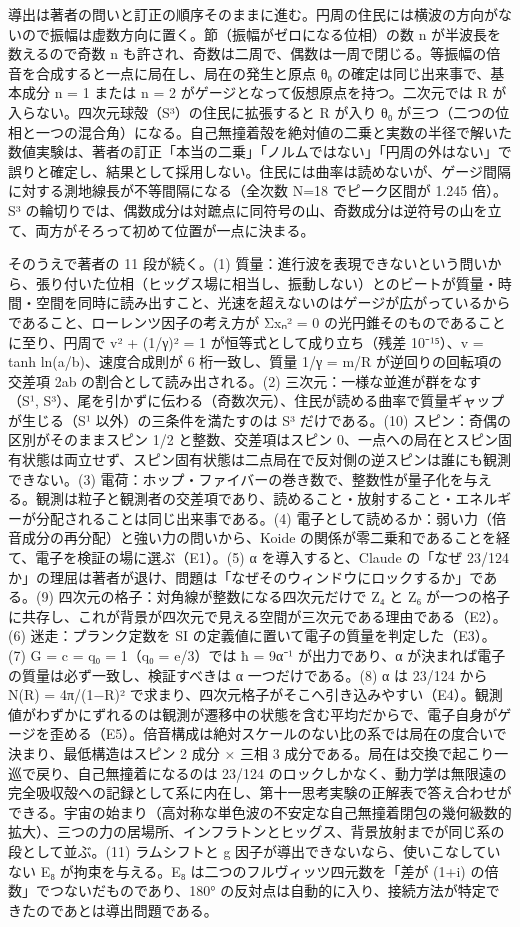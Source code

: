 \documentclass[
  a4paper,
]{ltjsarticle}
\begin{document}
導出は著者の問いと訂正の順序そのままに進む。円周の住民には横波の方向がないので振幅は虚数方向に置く。節（振幅がゼロになる位相）の数
n が半波長を数えるので奇数 n
も許され、奇数は二周で、偶数は一周で閉じる。等振幅の倍音を合成すると一点に局在し、局在の発生と原点
θ₀ の確定は同じ出来事で、基本成分 n = 1 または n = 2
がゲージとなって仮想原点を持つ。二次元では R
が入らない。四次元球殻（S³）の住民に拡張すると R が入り θ₀
が三つ（二つの位相と一つの混合角）になる。自己無撞着殻を絶対値の二乗と実数の半径で解いた数値実験は、著者の訂正「本当の二乗」「ノルムではない」「円周の外はない」で誤りと確定し、結果として採用しない。住民には曲率は読めないが、ゲージ間隔に対する測地線長が不等間隔になる（全次数
N=18 でピーク区間が 1.245 倍）。S³
の輪切りでは、偶数成分は対蹠点に同符号の山、奇数成分は逆符号の山を立て、両方がそろって初めて位置が一点に決まる。

そのうえで著者の 11 段が続く。(1)
質量：進行波を表現できないという問いから、張り付いた位相（ヒッグス場に相当し、振動しない）とのビートが質量・時間・空間を同時に読み出すこと、光速を超えないのはゲージが広がっているからであること、ローレンツ因子の考え方が
Σxₙ² = 0 の光円錐そのものであることに至り、円周で v² + (1/γ)² = 1
が恒等式として成り立ち（残差 10⁻¹⁵）、v = tanh ln(a/b)、速度合成則が 6
桁一致し、質量 1/γ = m/R が逆回りの回転項の交差項 2ab
の割合として読み出される。(2) 三次元：一様な並進が群をなす（S¹,
S³）、尾を引かずに伝わる（奇数次元）、住民が読める曲率で質量ギャップが生じる（S¹
以外）の三条件を満たすのは S³ だけである。(10)
スピン：奇偶の区別がそのままスピン 1/2 と整数、交差項はスピン
0、一点への局在とスピン固有状態は両立せず、スピン固有状態は二点局在で反対側の逆スピンは誰にも観測できない。(3)
電荷：ホップ・ファイバーの巻き数で、整数性が量子化を与える。観測は粒子と観測者の交差項であり、読めること・放射すること・エネルギーが分配されることは同じ出来事である。(4)
電子として読めるか：弱い力（倍音成分の再分配）と強い力の問いから、Koide
の関係が零二乗和であることを経て、電子を検証の場に選ぶ（E1）。(5) α
を導入すると、Claude の「なぜ 23/124
か」の理屈は著者が退け、問題は「なぜそのウィンドウにロックするか」である。(9)
四次元の格子：対角線が整数になる四次元だけで Z₄ と Z₆
が一つの格子に共存し、これが背景が四次元で見える空間が三次元である理由である（E2）。(6)
迷走：プランク定数を SI の定義値に置いて電子の質量を判定した（E3）。(7)
G = c = q₀ = 1（q₀ = e/3）では ħ = 9α⁻¹ が出力であり、α
が決まれば電子の質量は必ず一致し、検証すべきは α 一つだけである。(8) α
は 23/124 から N(R) = 4π/(1−R)²
で求まり、四次元格子がそこへ引き込みやすい（E4）。観測値がわずかにずれるのは観測が遷移中の状態を含む平均だからで、電子自身がゲージを歪める（E5）。倍音構成は絶対スケールのない比の系では局在の度合いで決まり、最低構造はスピン
2 成分 × 三相 3
成分である。局在は交換で起こり一巡で戻り、自己無撞着になるのは 23/124
のロックしかなく、動力学は無限遠の完全吸収殻への記録として系に内在し、第十一思考実験の正解表で答え合わせができる。宇宙の始まり（高対称な単色波の不安定な自己無撞着閉包の幾何級数的拡大）、三つの力の居場所、インフラトンとヒッグス、背景放射までが同じ系の段として並ぶ。(11)
ラムシフトと g 因子が導出できないなら、使いこなしていない E₈
が拘束を与える。E₈ は二つのフルヴィッツ四元数を「差が (1+i)
の倍数」でつないだものであり、180°
の反対点は自動的に入り、接続方法が特定できたのであとは導出問題である。
\end{document}
